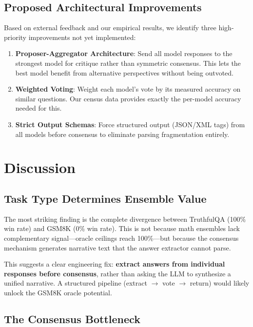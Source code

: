 \documentclass[11pt,a4paper]{article}
\begin{document}
\subsection{Proposed Architectural Improvements}

Based on external feedback and our empirical results, we identify three high-priority improvements not yet implemented:

\begin{enumerate}
    \item \textbf{Proposer-Aggregator Architecture}: Send all model responses to the strongest model for critique rather than symmetric consensus. This lets the best model benefit from alternative perspectives without being outvoted.
    \item \textbf{Weighted Voting}: Weight each model's vote by its measured accuracy on similar questions. Our census data provides exactly the per-model accuracy needed for this.
    \item \textbf{Strict Output Schemas}: Force structured output (JSON/XML tags) from all models before consensus to eliminate parsing fragmentation entirely.
\end{enumerate}

\section{Discussion}
\label{sec:discussion}

\subsection{Task Type Determines Ensemble Value}

The most striking finding is the complete divergence between TruthfulQA (100\% win rate) and GSM8K (0\% win rate).
This is not because math ensembles lack complementary signal---oracle ceilings reach 100\%---but because the consensus mechanism generates narrative text that the answer extractor cannot parse.

This suggests a clear engineering fix: \textbf{extract answers from individual responses before consensus}, rather than asking the LLM to synthesize a unified narrative.
A structured pipeline (extract $\rightarrow$ vote $\rightarrow$ return) would likely unlock the GSM8K oracle potential.

\subsection{The Consensus Bottleneck}
\end{document}

